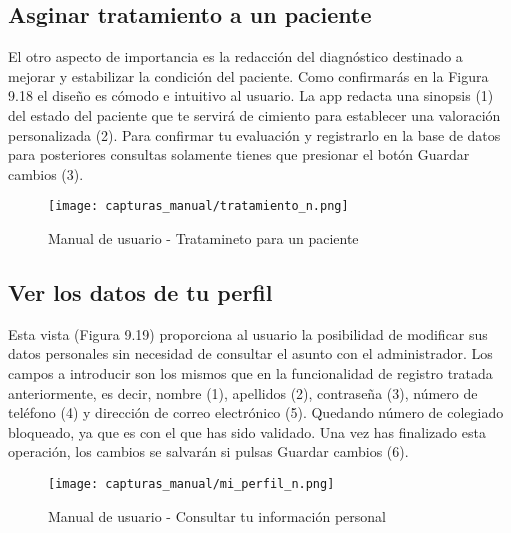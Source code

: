 \documentclass[11pt,spanish,
		listoftables,listoffigures]
		{tfgplantilla}
\begin{document}
\subsection {Asginar tratamiento a un paciente}

El otro aspecto de importancia es la redacción del diagnóstico destinado a mejorar y estabilizar la condición del paciente. Como confirmarás en la Figura 9.18 el diseño es cómodo e intuitivo al usuario. La app redacta una sinopsis (1) del estado del paciente que te servirá de cimiento para establecer una valoración personalizada (2). Para confirmar tu evaluación y registrarlo en la base de datos para posteriores consultas solamente tienes que presionar el botón \textquotedbl Guardar cambios\textquotedbl{} (3).

\begin{figure}[H]
\centering
\texttt{[image: capturas\_manual/tratamiento\_n.png]}
\caption{Manual de usuario - Tratamineto para un paciente}
\end{figure}

\newpage
\subsection {Ver los datos de tu perfil}

Esta vista (Figura 9.19) proporciona al usuario la posibilidad de modificar sus datos personales sin necesidad de consultar el asunto con el administrador. Los campos a introducir son los mismos que en la funcionalidad de registro tratada anteriormente, es decir, nombre (1), apellidos (2), contraseña (3), número de teléfono (4) y dirección de correo electrónico (5). Quedando número de colegiado bloqueado, ya que es con el que has sido validado. Una vez has finalizado esta operación, los cambios se salvarán si pulsas \textquotedbl Guardar cambios\textquotedbl{} (6).

\begin{figure}[H]
\centering
\texttt{[image: capturas\_manual/mi\_perfil\_n.png]}
\caption{Manual de usuario - Consultar tu información personal}
\end{figure}


\newpage
\end{document}
